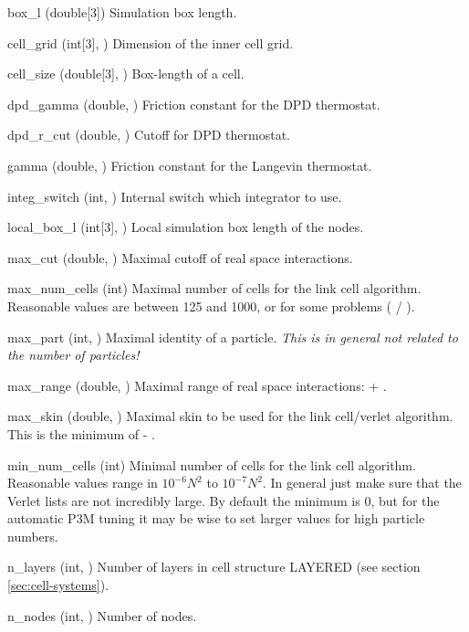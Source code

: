 \begin{globvar}
\item[box_l] (double[3]) Simulation box length.
\item[cell_grid] (int[3], \ro) Dimension of the inner
  cell grid.
\item[cell_size] (double[3], \ro) Box-length of a cell.
\item[dpd_gamma] (double, \ro) Friction constant for the
  DPD thermostat.
\item[dpd_r_cut] (double, \ro) Cutoff for DPD thermostat.
\item[gamma] (double, \ro) Friction constant for the
  Langevin thermostat.
\item[integ_switch] (int, \ro) Internal switch which integrator to
  use.
\item[local_box_l] (int[3], \ro) Local simulation box length of the
  nodes.
\item[max_cut] (double, \ro) Maximal cutoff of real space
  interactions.
\item[max_num_cells] (int) Maximal number of cells for the link cell
  algorithm.  Reasonable values are between 125 and 1000, or for some
  problems ( / ).
\item[max_part] (int, \ro) Maximal identity of a particle.
  \emph{This is in general not related to the number of particles!}
\item[max_range] (double, \ro) Maximal range of real space
  interactions:  + .
\item[max_skin] (double, \ro) Maximal skin to be used for the link
  cell/verlet algorithm. This is the minimum of  -
  .
\item[min_num_cells] (int) Minimal number of cells for the link cell
  algorithm. Reasonable values range in $10^{-6} N^2$ to $10^{-7}
  N^2$. In general just make sure that the Verlet lists are not
  incredibly large. By default the minimum is 0, but for the automatic
  P3M tuning it may be wise to set larger values for high particle
  numbers.
\item[n_layers] (int, \ro) Number of layers in cell structure LAYERED
  (see section \vref{sec:cell-systems}).
\item[n_nodes] (int, \ro) Number of nodes.

\end{globvar}
